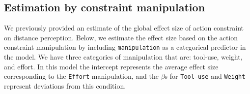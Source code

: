 \documentclass[floatsintext,doc]{apa6}
\newenvironment{Shaded}{\begin{snugshade}}{\end{snugshade}}
\newcommand{\DataTypeTok}[1]{\textcolor[rgb]{0.13,0.29,0.53}{#1}}
\newcommand{\DecValTok}[1]{\textcolor[rgb]{0.00,0.00,0.81}{#1}}
\newcommand{\FloatTok}[1]{\textcolor[rgb]{0.00,0.00,0.81}{#1}}
\newcommand{\KeywordTok}[1]{\textcolor[rgb]{0.13,0.29,0.53}{\textbf{#1}}}
\newcommand{\NormalTok}[1]{#1}
\newcommand{\OperatorTok}[1]{\textcolor[rgb]{0.81,0.36,0.00}{\textbf{#1}}}
\newcommand{\OtherTok}[1]{\textcolor[rgb]{0.56,0.35,0.01}{#1}}
\newcommand{\StringTok}[1]{\textcolor[rgb]{0.31,0.60,0.02}{#1}}
\begin{document}
\hypertarget{estimation-by-constraint-manipulation}{%
\subsection{Estimation by constraint manipulation}\label{estimation-by-constraint-manipulation}}

We previously provided an estimate of the global effect size of action constraint on distance perception. Below, we estimate the effect size based on the action constraint manipulation by including \texttt{manipulation} as a categorical predictor in the model. We have three categories of manipulation that are: tool-use, weight, and effort. In this model the intercept represents the average effect size corresponding to the \texttt{Effort} manipulation, and the \(\beta\)s for \texttt{Tool-use} and \texttt{Weight} represent deviations from this condition.

\begin{Shaded}
\end{Shaded}
\end{document}
